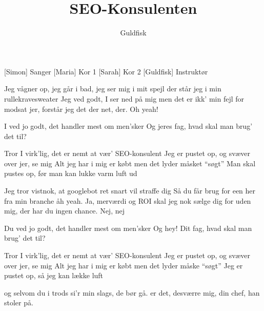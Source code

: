 \documentclass[a4paper,11pt]{article}
\title{SEO-Konsulenten}
\author{Guldfisk}
\begin{document}
\maketitle

\begin{roles}
  [Simon] Sanger
  [Maria] Kor 1
  [Sarah] Kor 2
  [Guldfisk] Instruktør
\end{roles}

\begin{song}

   Jeg vågner op,
   jeg går i bad,
   jeg ser mig i mit spejl
   der står jeg i min rullekravesweater
   Jeg ved godt, I
   ser ned på mig
   men det er ikk’ min fejl
   for modsat jer, forstår jeg det der net, der.
   Oh yeah!
  
   I ved jo godt,
   det handler mest om men’sker
   Og jeres fag, hvad skal man brug’ det til?

   Tror I virk'lig, det er nemt
   at vær’ SEO-konsulent
   Jeg er pustet op, og svæver over jer, se mig
   Alt jeg har i mig er købt
   men det lyder måsket ``søgt''
   Man skal pustes op, før man kan lukke varm luft ud
  
   Jeg tror vistnok,
   at googlebot
   ret snart vil straffe dig
   Så du får brug for een her fra min branche
   åh yeah.
   Ja, merværdi
   og ROI
   skal jeg nok sælge dig
   for uden mig, der har du ingen chance.
   Nej, nej
  
   Du ved jo godt,
   det handler mest om men’sker
   Og hey! Dit fag, hvad skal man brug’ det til?
  
   Tror I virk'lig, det er nemt
   at vær’ SEO-konsulent
   Jeg er pustet op, og svæver over jer, se mig
   Alt jeg har i mig er købt
   men det lyder måske ``søgt''
   Jeg er pustet op, så jeg kan lække luft
  
   og selvom du i trods
   si’r min slags, de bør gå.
   er det, desværre mig,
   din chef, han stoler på.
  

\end{song}
\end{document}
